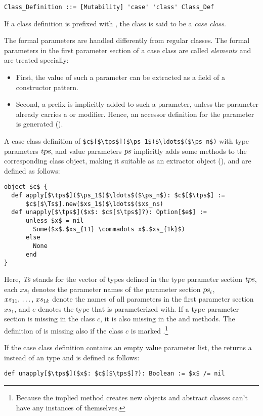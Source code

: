 \syntax\begin{lstlisting}
Class_Definition ::= [Mutability] 'case' 'class' Class_Def
\end{lstlisting}

If a class definition is prefixed with , the class is said to be a {\em case class}. 

The formal parameters are handled differently from regular classes. The formal parameters in the first parameter section of a case class are called {\em elements} and are treated specially:
\begin{itemize}
\item[] First, the value of such a parameter can be extracted as a field of a constructor pattern. 
\item[] Second, a  prefix is implicitly added to such a parameter, unless the parameter already carries a  or  modifier. Hence, an accessor definition for the parameter is generated (). 
\end{itemize}

A case class definition of \lstinline!$c$[$\tps$]($\ps_1$)$\ldots$($\ps_n$)! with type parameters $\mbox{\sl tps}$, and value parameters $\mbox{\sl ps}$ implicitly adds some methods to the corresponding class object, making it suitable as an extractor object (), and are defined as follows:
\begin{lstlisting}
object $c$ {
  def apply[$\tps$]($\ps_1$)$\ldots$($\ps_n$): $c$[$\tps$] := 
      $c$[$\Ts$].new($xs_1$)$\ldots$($xs_n$)
  def unapply[$\tps$]($x$: $c$[$\tps$]?): Option[$e$] :=
      unless $x$ = nil
        Some($x$.$xs_{11} \commadots x$.$xs_{1k}$)
      else
        None
      end
}
\end{lstlisting}

Here, $\mbox{\sl Ts}$ stands for the vector of types defined in the type parameter section $\mbox{\sl tps}$, each $xs_i$ denotes the parameter names of the parameter section $\mbox{\sl ps}_i$, $xs_{11} ,\, \ldots ,\, xs_{1k}$ denote the names of all parameters in the first parameter section $xs_1$, and $e$ denotes the type that  is parameterized with. If a type parameter section is missing in the class $c$, it is also missing in the  and  methods. The definition of  is missing also if the class $c$ is marked .\footnote{Because the implied  method creates new objects and abstract classes can't have any instances of themselves.}

If the case class definition contains an empty value parameter list, the  returns a  instead of an  type and is defined as follows:
\begin{lstlisting}
def unapply[$\tps$]($x$: $c$[$\tps$]?): Boolean := $x$ /= nil
\end{lstlisting}

